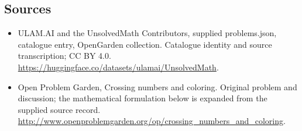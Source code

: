 \documentclass[11pt,a4paper]{article}
\begin{document}
\subsection{Sources}
\begin{itemize}
\item[S1] ULAM.AI and the UnsolvedMath Contributors, supplied problems.json, catalogue entry, OpenGarden collection. Catalogue identity and source transcription; CC BY 4.0.
\url{https://huggingface.co/datasets/ulamai/UnsolvedMath}.
\item[S2] Open Problem Garden, Crossing numbers and coloring. Original problem and discussion; the mathematical formulation below is expanded from the supplied source record.
\url{http://www.openproblemgarden.org/op/crossing_numbers_and_coloring}.

\end{itemize}
\end{document}
